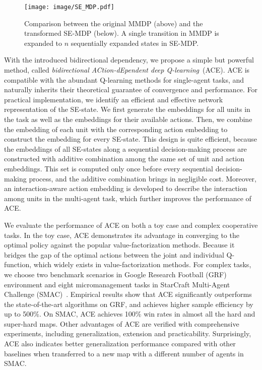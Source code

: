 \documentclass[letterpaper]{article} \usepackage{aaai23}  \usepackage{times}  \usepackage{helvet}  \usepackage{courier}  \usepackage[hyphens]{url}  \usepackage{graphicx} \urlstyle{rm} \def\UrlFont{\rm}  \usepackage{natbib}  \usepackage{caption} \frenchspacing  \setlength{\pdfpagewidth}{8.5in} \setlength{\pdfpageheight}{11in} \usepackage{algorithm}
\begin{document}
\begin{figure*}[t]
    \centering
    \texttt{[image: image/SE\_MDP.pdf]}
\vspace{-3ex}
    \caption{Comparison between the original MMDP (above) and the transformed SE-MDP (below). A single transition in MMDP is expanded to $n$ sequentially expanded states in SE-MDP.}
\vspace{-3ex}
    \label{fig:mdp}
\end{figure*}

With the introduced bidirectional dependency, we propose a simple but powerful method, called \textit{bidirectional ACtion-dEpendent deep Q-learning}~(ACE). ACE is compatible with the abundant Q-learning methods for single-agent tasks, and naturally inherits their theoretical guarantee of convergence and performance. For practical implementation, we identify an efficient and effective network representation of the SE-state. 
We first generate the embeddings for all units in the task as well as the embeddings for their available actions. 
Then, we combine the embedding of each unit with the corresponding action embedding to construct the embedding for every SE-state. 
This design is quite efficient, because the embeddings of all SE-states along a sequential decision-making process are constructed with additive combination among the same set of unit and action embeddings. This set is computed only once before every sequential decision-making process, and the additive combination brings in negligible cost. 
Moreover, an interaction-aware action embedding is developed to describe the interaction among units in the multi-agent task, which further improves the performance of ACE.

We evaluate the performance of ACE on both a toy case and complex cooperative tasks. In the toy case, ACE demonstrates its advantage in converging to the optimal policy against the popular value-factorization methods. Because it bridges the gap of the optimal actions between the joint and individual Q-function, which widely exists in value-factorization methods. For complex tasks, we choose two benchmark scenarios in Google Research Football (GRF)~\citeyear{grf} environment and eight micromanagement tasks in StarCraft Multi-Agent Challenge (SMAC)~\citeyear{smac}. Empirical results show that ACE significantly outperforms the state-of-the-art algorithms on GRF, and achieves higher sample efficiency by up to 500\%. On SMAC, ACE achieves 100\% win rates in almost all the hard and super-hard maps. Other advantages of ACE are verified with comprehensive experiments, including generalization, extension and practicability. Surprisingly, ACE also indicates better generalization performance compared with other baselines when transferred to a new map with a different number of agents in SMAC.
\end{document}
